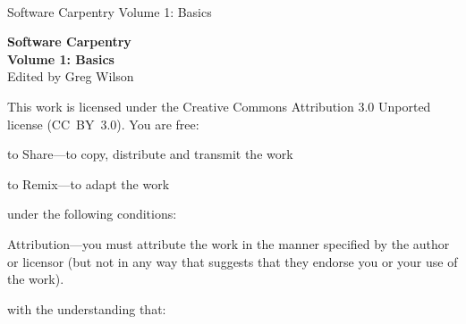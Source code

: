 \newpage

\thispagestyle{empty}

~\\

\vspace{5cm}

\begin{center}

\fontsize{45}{55}\selectfont

\noindent
Software Carpentry
\vspace{0.5\baselineskip}
\noindent
Volume 1: Basics

\end{center}

\newpage

\thispagestyle{empty}

\small
\noindent \textbf{Software Carpentry\\Volume 1: Basics} \\
Edited by Greg Wilson

\vspace{2.15cm}

\noindent
This work is licensed under the Creative Commons Attribution 3.0
Unported license (CC~BY~3.0).  You are free:

\begin{swcitemize}
  \item to Share---to copy, distribute and transmit the work
  \item to Remix---to adapt the work
\end{swcitemize}

\noindent
under the following conditions:

\begin{swcitemize}
  \item Attribution---you must attribute the work in the manner
    specified by the author or licensor (but not in any way that
    suggests that they endorse you or your use of the work).
\end{swcitemize}

\noindent
with the understanding that:

